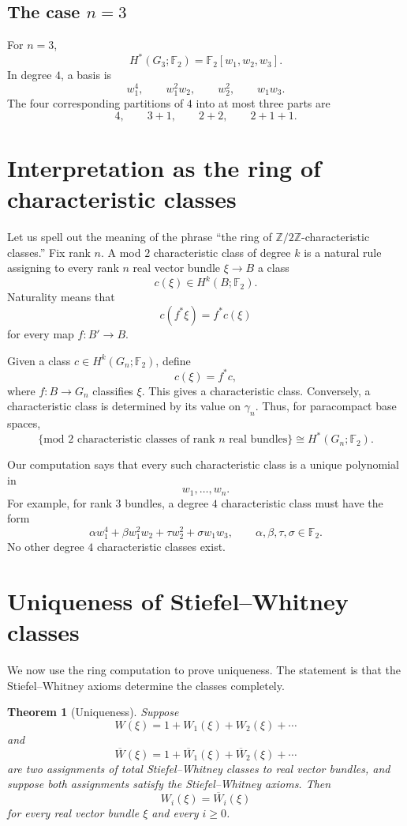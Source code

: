 \documentclass[11pt]{article}
\newtheorem{theorem}{Theorem}[section]
\theoremstyle{remark}
\newcommand{\F}{\mathbb F}
\newcommand{\Gn}{G_n}
\newcommand{\gamman}{\gamma_n}
\newcommand{\olW}{\overline{W}}
\begin{document}
\subsection{The case $n=3$}

For $n=3$,
\[
  H^*(G_3;\F_2)=\F_2[w_1,w_2,w_3].
\]
In degree $4$, a basis is
\[
  w_1^4,
  \qquad w_1^2w_2,
  \qquad w_2^2,
  \qquad w_1w_3.
\]
The four corresponding partitions of $4$ into at most three parts are
\[
  4,
  \qquad 3+1,
  \qquad 2+2,
  \qquad 2+1+1.
\]

\section{Interpretation as the ring of characteristic classes}

Let us spell out the meaning of the phrase ``the ring of $\mathbb Z/2\mathbb Z$-characteristic classes.''  Fix rank $n$.  A mod $2$ characteristic class of degree $k$ is a natural rule assigning to every rank $n$ real vector bundle $\xi\to B$ a class
\[
  c(\xi)\in H^k(B;\F_2).
\]
Naturality means that
\[
  c(f^*\xi)=f^*c(\xi)
\]
for every map $f:B'\to B$.

Given a class $c\in H^k(\Gn;\F_2)$, define
\[
  c(\xi)=f^*c,
\]
where $f:B\to \Gn$ classifies $\xi$.  This gives a characteristic class.  Conversely, a characteristic class is determined by its value on $\gamman$.  Thus, for paracompact base spaces,
\[
  \{\text{mod $2$ characteristic classes of rank $n$ real bundles}\}
  \cong H^*(\Gn;\F_2).
\]

Our computation says that every such characteristic class is a unique polynomial in
\[
  w_1,\dots,w_n.
\]
For example, for rank $3$ bundles, a degree $4$ characteristic class must have the form
\[
  \alpha w_1^4+\beta w_1^2w_2+\tau w_2^2+\sigma w_1w_3,
  \qquad \alpha,\beta,\tau,\sigma\in \F_2.
\]
No other degree $4$ characteristic classes exist.

\section{Uniqueness of Stiefel--Whitney classes}

We now use the ring computation to prove uniqueness.  The statement is that the Stiefel--Whitney axioms determine the classes completely.

\begin{theorem}[Uniqueness]\label{thm:uniqueness}
Suppose
\[
  W(\xi)=1+W_1(\xi)+W_2(\xi)+\cdots
\]
and
\[
  \olW(\xi)=1+\olW_1(\xi)+\olW_2(\xi)+\cdots
\]
are two assignments of total Stiefel--Whitney classes to real vector bundles, and suppose both assignments satisfy the Stiefel--Whitney axioms.  Then
\[
  W_i(\xi)=\olW_i(\xi)
\]
for every real vector bundle $\xi$ and every $i\ge 0$.
\end{theorem}
\end{document}
